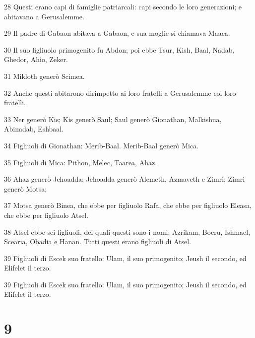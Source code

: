 \par 28 Questi erano capi di famiglie patriarcali: capi secondo le loro generazioni; e abitavano a Gerusalemme.
\par 29 Il padre di Gabaon abitava a Gabaon, e sua moglie si chiamava Maaca.
\par 30 Il suo figliuolo primogenito fu Abdon; poi ebbe Tsur, Kish, Baal, Nadab, Ghedor, Ahio, Zeker.
\par 31 Mikloth generò Scimea.
\par 32 Anche questi abitarono dirimpetto ai loro fratelli a Gerusalemme coi loro fratelli.
\par 33 Ner generò Kis; Kis generò Saul; Saul generò Gionathan, Malkishua, Abinadab, Eshbaal.
\par 34 Figliuoli di Gionathan: Merib-Baal. Merib-Baal generò Mica.
\par 35 Figliuoli di Mica: Pithon, Melec, Taarea, Ahaz.
\par 36 Ahaz generò Jehoadda; Jehoadda generò Alemeth, Azmaveth e Zimri; Zimri generò Motsa;
\par 37 Motsa generò Binea, che ebbe per figliuolo Rafa, che ebbe per figliuolo Eleasa, che ebbe per figliuolo Atsel.
\par 38 Atsel ebbe sei figliuoli, dei quali questi sono i nomi: Azrikam, Bocru, Ishmael, Scearia, Obadia e Hanan. Tutti questi erano figliuoli di Atsel.
\par 39 Figliuoli di Escek suo fratello: Ulam, il suo primogenito; Jeush il secondo, ed Elifelet il terzo.
\par 39 Figliuoli di Escek suo fratello: Ulam, il suo primogenito; Jeush il secondo, ed Elifelet il terzo.

\chapter{9}

